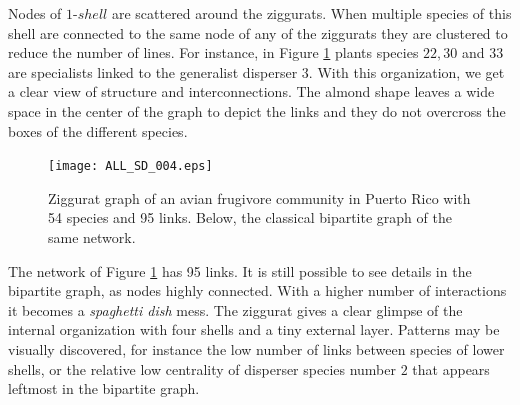 \documentclass[12pt]{article}
\begin{document}
Nodes of $1$-$shell$ are scattered around the ziggurats. When multiple species of this shell are connected to the same node of any of the ziggurats they are clustered to reduce the number of lines. For instance, in Figure \ref{fig:ziggurat} plants species $22, 30$ and $33$ are specialists linked to the generalist disperser $3$. With this organization, we get a clear view of structure and interconnections. The almond shape leaves a wide space in the center of the graph to depict the links and they do not overcross the boxes of the different species.





\begin{figure}[h!]
\centering
\texttt{[image: ALL\_SD\_004.eps]}
\caption {Ziggurat graph of an avian frugivore community in Puerto Rico with 54 species and 95 links\cite{carlo:2003avian}. Below, the classical bipartite graph of the same network.}
\label{fig:ziggurat}
\end{figure}

The network of Figure \ref{fig:ziggurat} has 95 links. It is still possible to see details in the bipartite graph, as nodes highly connected. With a higher number of interactions it becomes a \textit{spaghetti dish} mess. The ziggurat gives a clear glimpse of the internal organization with four shells and a tiny external layer. Patterns may be visually discovered, for instance the low number of links between species of lower shells, or the relative low centrality of disperser species number $2$ that appears leftmost in the bipartite graph. 


\printbibliography[heading=bibintoc]
\end{document}
